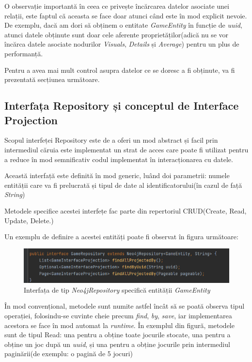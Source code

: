 \documentclass[12pt,a4paper]{report}
\begin{document}
O observație importantă în ceea ce privește încărcarea datelor asociate unei relații, este faptul că aceasta se face doar atunci când este în mod explicit nevoie. De exemplu, dacă am dori să obținem o entitate \emph{GameEntity} în funcție de \emph{uuid}, atunci datele obținute sunt doar cele aferente proprietăților(adică nu se vor încărca datele asociate nodurilor \emph{Visuals}, \emph{Details} și \emph{Average}) pentru un plus de performanță.

Pentru a avea mai mult control asupra datelor ce se doresc a fi obținute, va fi prezentată secțiunea următoare.

\subsection{Interfața Repository și conceptul de Interface Projection}

Scopul interfeței Repository este de a oferi un mod abstract și facil prin intermediul căruia este implementat un strat de acces care poate fi utilizat pentru a reduce în mod semnificativ codul implementat în interacționarea cu datele. \cite{22}

Această interfață este definită în mod generic, luând doi parametrii: numele entității care va fi prelucrată și tipul de date al identificatorului(în cazul de față \emph{String})

Metodele specifice acestei interfețe fac parte din repertoriul CRUD(Create, Read, Update, Delete.)

Un exemplu de definire a acestei entități poate fi observat în figura următoare:

\begin{figure}[H]
\centering
\caption{}
\includegraphics[scale = 0.8]{exemplu_19_repository}
\caption*{Interfața de tip \emph{Neo4jRepository} specifică entității \emph{GameEntity}}
\end{figure}

În mod convențional, metodele sunt numite astfel încât să se poată observa tipul operației, folosindu-se cuvinte cheie precum \emph{find}, \emph{by}, \emph{save}, iar implementarea acestora se face în mod automat la \emph{runtime}. În exemplul din figură, metodele sunt de tipul Read: una pentru a obține toate jocurile stocate, una pentru a obține un joc după un \emph{uuid}, și una pentru a obține jocurile prin intermediul paginării(de exemplu: o pagină de 5 jocuri)
\end{document}
